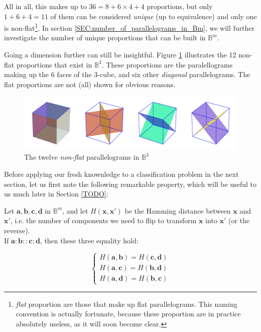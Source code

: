 All in all, this makes up to $36 = 8 + 6 \times 4 + 4$ proportions, but only $1
+ 6 + 4 = 11$ of them can be considered \textit{unique} (up to equivalence) and
only one is non-flat\footnote{\textit{flat} proportion are those that make up
flat parallelograms. This naming convention is actually fortunate, because
these proportion are in practice absolutely useless, as it will soon become
clear.}. In section \ref{SEC:number_of_parallelograms_in_Bm}, we will further
investigate the number of unique proportions that can be built in
$\mathbb{B}^m$.

Going a dimension further can still be insightful. Figure \ref{FIG:cubes_in_B3}
illustrates the 12 non-flat proportions that exist in $\mathbb{B}^3$. These
proportions are the paralellograms making up the 6 faces of the $3$-cube, and
six other \textit{diagonal} parallelograms. The flat proportions are not (all)
shown for obvious reasons.

\begin{figure}[!h]
\centering
\includegraphics[width=\linewidth]{figures/cubes_in_B3.pdf}
  \caption{The twelve \textit{non-flat} parallelograms in $\mathbb{B}^3$}
\label{FIG:cubes_in_B3}
\end{figure}

Before applying our fresh knownledge to a classification problem in the next
section, let us first note the following remarkable property, which will be
useful to us much later in Section \ref{TODO}:

\begin{property}
  \label{PROPER:hamming_distance_boolean_proportion}
  Let $\mathbf{a}, \mathbf{b},\mathbf{c}, \mathbf{d}$ in $\mathbb{B}^m$, and
  let $H(\mathbf{x}, \mathbf{x'})$ be the Hamming distance between $\mathbf{x}$
  and $\mathbf{x'}$, i.e. the number of components we need to flip to transform
  $\mathbf{x}$ into $\mathbf{x'}$ (or the reverse).\\
  If $\mathbf{a} : \mathbf{b}
  :: \mathbf{c} : \mathbf{d}$, then these three equality hold:

  $$
  \begin{cases}
    H(\mathbf{a}, \mathbf{b}) = H(\mathbf{c}, \mathbf{d})\\
    H(\mathbf{a}, \mathbf{c}) = H(\mathbf{b}, \mathbf{d})\\
    H(\mathbf{a}, \mathbf{d}) = H(\mathbf{b}, \mathbf{c})
  \end{cases}
  $$
\end{property}


